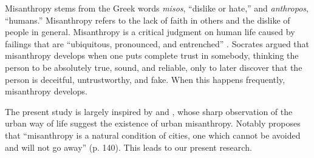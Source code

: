 \documentclass[11pt, letterpaper]{article}
\newcommand{\hilite}[1]{\textcolor{black}{#1}}
\begin{document}
\begin{spacing}{1.4}
Misanthropy stems from the Greek words \textit{misos}, ``dislike or hate,'' and
\textit{anthropos}, ``humans.''  Misanthropy refers to the lack of faith in others and the dislike of people in general.
%
Misanthropy is a critical judgment on human life caused by failings that are
``ubiquitous, pronounced, and entrenched''
\citep[p. 7]{cooper2018animals}.
Socrates \citep[cited in][]{melgar13} argued
that misanthropy develops when one puts complete trust in somebody, thinking the
person to be absolutely true, sound, and reliable, only to later discover that
the person is deceitful, untrustworthy, and fake. When this happens frequently,
misanthropy develops.
 

The present study is largely 
inspired by \citet{amin06} and \citet{thrift05}, whose sharp observation of
the urban way of life suggest the existence of urban misanthropy. 
 Notably \citet[]{thrift05} proposes that ``misanthropy is a natural
condition of cities, one which cannot be avoided and will not go away''
(p. 140). This leads to our present research. %


\end{spacing}
\end{document}
